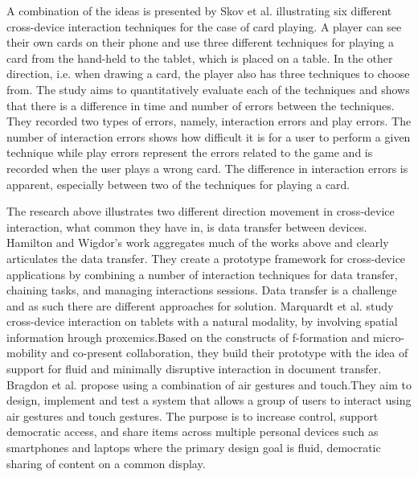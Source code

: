 A combination of the ideas is presented by Skov et al. \cite{Skov:2015} illustrating six different cross-device interaction techniques for the case of card playing.
A player can see their own cards on their phone and use three different techniques for playing a card from the hand-held to the tablet, which is placed on a table.
In the other direction, i.e. when drawing a card, the player also has three techniques to choose from.
The study aims to quantitatively evaluate each of the techniques and shows that there is a difference in time and number of errors between the techniques. 
They recorded two types of errors, namely, interaction errors and play errors.
The number of interaction errors shows how difficult it is for a user to perform a given technique while play errors represent the errors related to the game and is recorded when the user plays a wrong card.
The difference in interaction errors is apparent, especially between two of the techniques for playing a card.

The research above illustrates two different direction movement in cross-device interaction, what common they have in, is data transfer between devices.
Hamilton and Wigdor's  work \cite{Hamilton:2014} aggregates much of the works above and clearly articulates the data transfer. They create a prototype framework for cross-device applications by combining a number of interaction techniques for data transfer, chaining tasks, and managing interactions sessions.
Data transfer is a challenge and as such there are different approaches for solution. Marquardt et al. \cite{Marquardt:2012} study cross-device interaction on tablets with a  natural modality, by involving spatial information hrough proxemics.Based on the constructs of f-formation and micro-mobility and co-present collaboration, they build their prototype with the idea of support for fluid and minimally disruptive interaction in document transfer. 
Bragdon et al.\cite{Bragdon:2011} propose using a combination of air gestures and touch.They aim to design, implement and test a system that allows a group of users to interact using air gestures and touch gestures. The purpose is to increase control, support democratic access, and share items across multiple personal devices such as smartphones and laptops where the primary design goal is fluid, democratic sharing of content on a common display.


